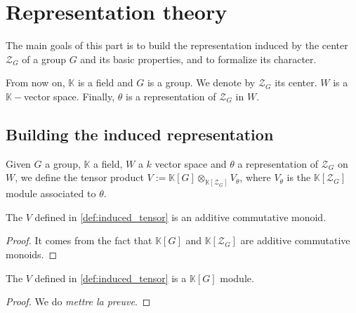 \section{Representation theory}
The main goals of this part is to build the representation induced
by the center $\mathcal{Z}_G$ of a group $G$ and its basic properties, 
and to formalize its character.
\newline

From now on, $\mathbb{K}$ is a field and $G$ is a group. We denote by
$\mathcal{Z}_G$ its center. $W$ is a $\mathbb{K}-$vector space. Finally,
$\theta$ is a representation of $\mathcal{Z}_G$ in $W$.

\subsection{Building the induced representation}

\begin{definition}
    \label{def:induced_tensor}
    \leanok
    Given $G$ a group, $\mathbb{K}$ a field, $W$ a $k$ vector space and $\theta$ a representation of
    $\mathcal{Z}_G$ on $W$, we define the tensor product $V:=\mathbb{K}[G]\otimes_{\mathbb{K}[\mathcal{Z}_G]}V_\theta$,
    where $V_\theta$ is the $\mathbb{K}[\mathcal{Z}_G]$ module associated to $\theta$.
\end{definition}

\begin{proposition}
    \label{prop:induced_add_comm_mono}
    \leanok 
    The $V$ defined in \ref{def:induced_tensor} is an additive commutative monoid.
\end{proposition}
\begin{proof}
    \leanok
    It comes from the fact that $\mathbb{K}[G]$ and $\mathbb{K}[\mathcal{Z}_G]$ are
    additive commutative monoids.
\end{proof}

\begin{proposition}
    \label{prop:tensor_module_mono}
    \leanok 
    The $V$ defined in \ref{def:induced_tensor} is a $\mathbb{K}[G]$ module.
\end{proposition}
\begin{proof}
    \leanok
    We do \textit{mettre la preuve}.
\end{proof}


